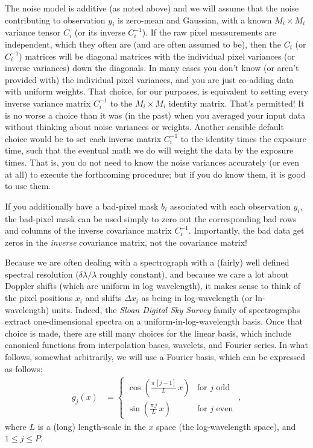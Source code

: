 \documentclass[modern]{aastex631}
\begin{document}
The noise model is additive (as noted above) and we will assume that the noise contributing to observation $y_i$ is zero-mean and Gaussian, with a known $M_i\times M_i$ variance tensor $C_i$ (or its inverse $C_i^{-1}$).
If the raw pixel measurements are independent, which they often are (and are often assumed to be), then the $C_i$ (or $C_i^{-1}$) matrices will be diagonal matrices with the individual pixel variances (or inverse variances) down the diagonals.
In many cases you don't know (or aren't provided with) the individual pixel variances, and you are just co-adding data with uniform weights.
That choice, for our purposes, is equivalent to setting every inverse variance matrix $C_i^{-1}$ to the $M_i\times M_i$ identity matrix.
That's permitted!
It is no worse a choice than it was (in the past) when you averaged your input data without thinking about noise variances or weights.
Another sensible default choice would be to set each inverse matrix $C_i^{-1}$ to the identity times the exposure time, such that the eventual math we do will weight the data by the exposure times.
That is, you do not need to know the noise variances accurately (or even at all) to execute the forthcoming procedure; but if you do know them, it is good to use them.

If you additionally have a bad-pixel mask $b_i$ associated with each observation $y_i$, the bad-pixel mask can be used simply to zero out the corresponding bad rows and columns of the inverse covariance matrix $C_i^{-1}$.
Importantly, the bad data get zeros in the \emph{inverse} covariance matrix, not the covariance matrix!

Because we are often dealing with a spectrograph with a (fairly) well defined spectral resolution ($\delta\lambda/\lambda$ roughly constant), and because we care a lot about Doppler shifts (which are uniform in log wavelength), it makes sense to think of the pixel positions $x_i$ and shifts $\Delta x_i$ as being in log-wavelength (or ln-wavelength) units.
Indeed, the \textsl{Sloan Digital Sky Survey} family of spectrographs extract one-dimensional spectra on a uniform-in-log-wavelength basis.
Once that choice is made, there are still many choices for the linear basis,
which include canonical functions from interpolation bases, wavelets, and Fourier series.
In what follows, somewhat arbitrarily, we will use a Fourier basis, which can be expressed as follows:
\begin{align}
    g_j(x) & = \left\{\begin{array}{cl}\displaystyle\cos\left(\frac{\pi\,[j-1]}{L}\,x\right) & \mbox{for $j$ odd} \\[3ex]
    \displaystyle\sin\left(\frac{\pi\,j}{L}\,x\right) & \mbox{for $j$ even}\end{array}\right. ~,\label{eq:basis}
\end{align}
where $L$ is a (long) length-scale in the $x$ space (the log-wavelength space), and $1\leq j\leq P$.
\end{document}

